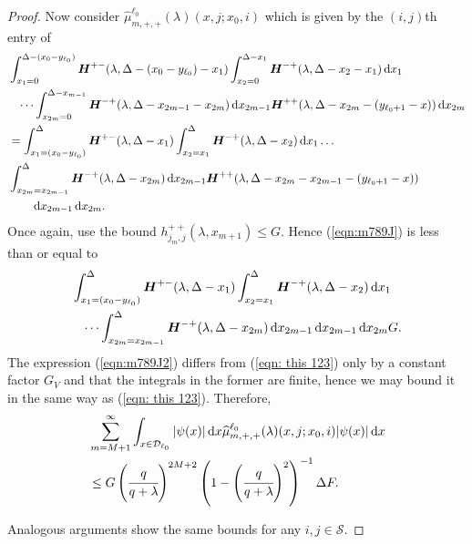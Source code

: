 \begin{proof}
        Now consider \(\widehat\mu_{m,+,+}^{\ell_0}(\lambda)( x,j;x_0,i) \) which is given by the \((i,j)\)th entry of 
        \begin{align}
		\nonumber& \int_{x_1 = 0}^{\Delta-(x_0-y_{\ell_0})} \boldsymbol H^{+-}(\lambda,\Delta-(x_0-y_{\ell_0})-x_1) \int_{x_2 = 0}^{\Delta-x_1} \boldsymbol H^{-+}(\lambda,\Delta - x_2-x_1) \, \mathrm{d} x_1 
		\\\nonumber &\quad\dots  
		\int_{x_{2m}=0}^{\Delta-x_{m-1}} \boldsymbol H^{-+}(\lambda,\Delta -x_{2m-1} - x_{2m}) \, \mathrm{d} x_{2m-1}
		 \boldsymbol H^{++}(\lambda,\Delta -x_{2m}- (y_{\ell_0+1}- x))\, \mathrm{d} x_{2m}
		\\\nonumber&= \int_{x_1 = (x_0-y_{\ell_0})}^{\Delta} \boldsymbol H^{+-}(\lambda,\Delta-x_1) \int_{x_2 = x_1}^{\Delta} \boldsymbol H^{-+}(\lambda,\Delta -x_2) \, \mathrm{d} x_1 
		\dots  
		\\&\int_{x_{2m}=x_{2m-1}}^{\Delta} \boldsymbol H^{-+}(\lambda,\Delta - x_{2m}) \, \mathrm{d} x_{2m-1}
		\boldsymbol H^{++}(\lambda,\Delta -x_{2m}-x_{2m-1}- (y_{\ell_0+1}- x))\nonumber 
		\\&\qquad {}\, \mathrm{d} x_{2m-1}\, \mathrm{d} x_{2m}.\label{eqn:m789J}
        \end{align}
        Once again, use the bound \(h^{++}_{j_m,j}(\lambda,x_{m+1})\leq G\). Hence (\ref{eqn:m789J}) is less than or equal to 
        \begin{align}
        		&\int_{x_1 = (x_0-y_{\ell_0})}^{\Delta} \boldsymbol H^{+-}(\lambda,\Delta-x_1) \int_{x_2 = x_1}^{\Delta} \boldsymbol H^{-+}(\lambda,\Delta -x_2) \, \mathrm{d} x_1 \nonumber
		\\&\quad\dots  
		\int_{x_{2m}=x_{2m-1}}^{\Delta} \boldsymbol H^{-+}(\lambda,\Delta - x_{2m}) \, \mathrm{d} x_{2m-1}
		\, \mathrm{d} x_{2m-1}\, \mathrm{d} x_{2m}G.\label{eqn:m789J2}
        \end{align}
        The expression (\ref{eqn:m789J2}) differs from (\ref{eqn: this 123}) only by a constant factor \(G_V\) and that the integrals in the former are finite, hence we may bound it in the same way as (\ref{eqn: this 123}). Therefore, 
        \begin{align}
	         & \sum_{m=M+1}^\infty \int_{x\in\mathcal{D}_{\ell_0}} |\psi(x)|\, \mathrm{d} x \widehat \mu^{\ell_0}_{m,+,+}(\lambda)(x,j;x_0,i) |\psi(x)|\, \mathrm{d} x \nonumber
	        \\&\leq G\left(\cfrac{q}{q+\lambda}\right)^{2M+2} \left(1-\left(\cfrac{q}{q+\lambda}\right)^2\right)^{-1}\Delta F.
        \end{align}
        
	Analogous arguments show the same bounds for any \(i,j\in\mathcal S\). 
\end{proof}

